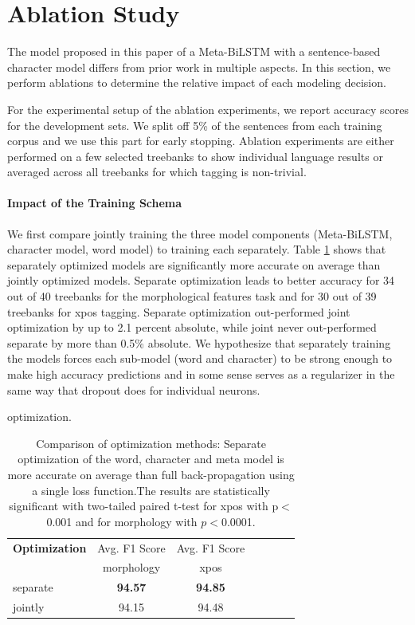 \documentclass[11pt,a4paper]{article}
\begin{document}
\section{Ablation Study}

The model proposed in this paper of a Meta-BiLSTM with a sentence-based character model differs from prior work in multiple aspects.
In this section, we perform ablations to determine the relative impact of each modeling decision.



For the experimental setup of the ablation experiments, we report accuracy scores for the development sets. We split off 5\% of the sentences from each training corpus and we use this part for early stopping. Ablation experiments are either performed on a few selected treebanks to show individual language results or averaged across all treebanks for which tagging is non-trivial.


\paragraph{Impact of the Training Schema}
We first compare jointly training the three model components (Meta-BiLSTM, character model, word model)  to training each separately.
Table \ref{tab:ablation-opt-sep-full} shows that separately optimized models are significantly more accurate on average than jointly optimized models. 
Separate optimization leads to better accuracy for 34 out of 40 treebanks for the morphological features task and for 30 out of 39 treebanks for xpos tagging. Separate optimization out-performed joint optimization by up to 2.1 percent absolute, while joint never out-performed separate by more than 0.5\% absolute.
We hypothesize that separately training the models forces each sub-model (word and character) to be strong enough to make high accuracy predictions and in some sense serves as a regularizer in the same way that dropout does for individual neurons.

 optimization.
\begin{table}[ht!]
\begin{center}
\small
\setlength{\tabcolsep}{3.5pt}
\begin{tabular}{|l|c|c|c|c|c|c}
\hline 
 \bf Optimization   & Avg. F1 Score   & Avg. F1 Score \\ 
                    &  morphology &  xpos \\ \hline
separate  & \bf 94.57 &  \bf 94.85   \\
jointly   &     94.15  &  94.48    \\
 \hline
\end{tabular}
\end{center}
\caption{Comparison of optimization methods: Separate optimization of the word, character and meta model is more accurate on average than full back-propagation using a single loss function.The results are statistically significant with two-tailed paired t-test for xpos with p$<$0.001 and for morphology with $p<$0.0001.}
\label{tab:ablation-opt-sep-full}
\end{table}
\end{document}
